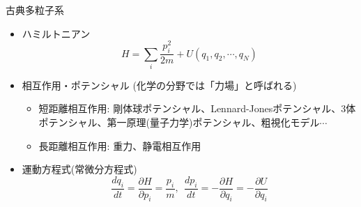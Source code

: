 
\begin{frame}[t,fragile]{古典多粒子系}
  \begin{itemize}
  \item ハミルトニアン
    \[
    H = \sum_i \frac{p_i^2}{2m} + U(q_1, q_2, \cdots, q_N)
    \]
  \item 相互作用・ポテンシャル (化学の分野では「力場」と呼ばれる)
    \begin{itemize}
    \item 短距離相互作用: 剛体球ポテンシャル、Lennard-Jonesポテンシャル、3体ポテンシャル、第一原理(量子力学)ポテンシャル、粗視化モデル$\cdots$
    \item 長距離相互作用: 重力、静電相互作用
    \end{itemize}
  \item 運動方程式(常微分方程式)
    \[
    \frac{dq_i}{dt} = \frac{\partial H}{\partial p_i} = \frac{p_i}{m}, \ \ \frac{dp_i}{dt} = - \frac{\partial H}{\partial q_i} = - \frac{\partial U}{\partial q_i}
    \]
  \end{itemize}
\end{frame}
